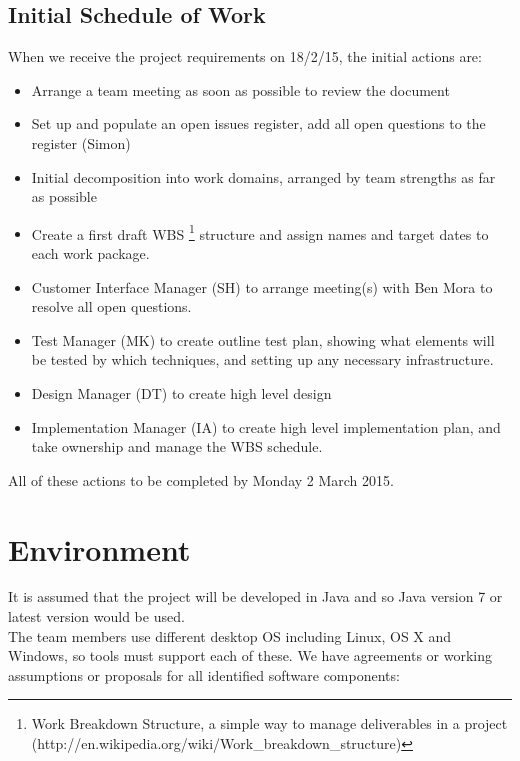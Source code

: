 \documentclass{article}
\begin{document}
\subsection{Initial Schedule of Work}

When we receive the project requirements on 18/2/15, the initial actions are:

\begin{itemize}
  \item Arrange a team meeting as soon as possible to review the document
  \item Set up and populate an open issues register, add all open questions to the register (Simon)
  \item Initial decomposition into work domains, arranged by team strengths as far as possible
  \item Create a first draft WBS \footnote{Work Breakdown Structure, a simple way to manage deliverables in a project (http://en.wikipedia.org/wiki/Work\_breakdown\_structure)} structure and assign names and target dates to each work package.
  \item Customer Interface Manager (SH) to arrange meeting(s) with Ben Mora to resolve all open questions.
  \item Test Manager (MK) to create outline test plan, showing what elements will be tested by which techniques, and setting up any necessary infrastructure.
  \item Design Manager (DT) to create high level design
  \item Implementation Manager (IA) to create high level implementation plan, and take ownership and manage the WBS schedule.
\end{itemize}
All of these actions to be completed by Monday 2 March 2015.

\section{Environment}
It is assumed that the project will be developed in Java and so Java version 7 or latest version would be used. 
\\
The team members use different desktop OS including Linux, OS X and Windows, so tools must support each of these. We have agreements or working assumptions or proposals for all identified software components:\par
\end{document}
